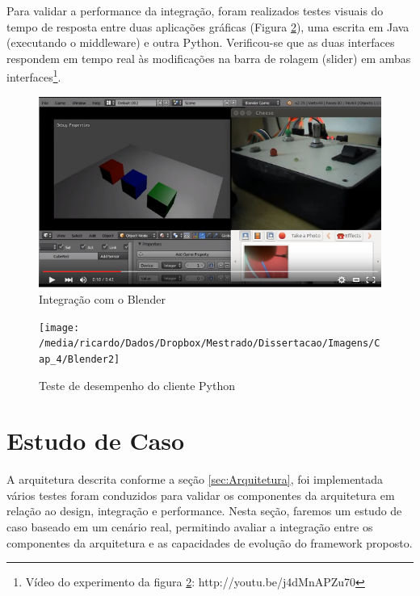 Para validar a performance da integração, foram realizados testes
visuais do tempo de resposta entre duas aplicações gráficas (Figura
\ref{fig:blender2}), uma escrita em Java (executando o middleware)
e outra Python. Verificou-se que as duas interfaces respondem em tempo
real às modificações na barra de rolagem (slider) em ambas interfaces\footnote{Vídeo do experimento da figura \ref{fig:blender2}: http://youtu.be/j4dMnAPZu70}.

\begin{figure}[h]
\begin{centering}
\includegraphics[width=1\linewidth]{Imagens/Cap_4/Blender}
\par\end{centering}
\caption{Integração com o Blender\label{fig:blender1}}
\end{figure}

\begin{figure}[h]
\begin{centering}
\texttt{[image: /media/ricardo/Dados/Dropbox/Mestrado/Dissertacao/Imagens/Cap\_4/Blender2]}
\par\end{centering}
\caption{Teste de desempenho do cliente Python\label{fig:blender2}}
\end{figure}


\section{Estudo de Caso\label{sec:Estudo-de-Caso}}

A arquitetura descrita conforme a seção \ref{sec:Arquitetura}, foi
implementada vários testes foram conduzidos para validar os componentes
da arquitetura em relação ao design, integração e performance. Nesta
seção, faremos um estudo de caso baseado em um cenário real, permitindo
avaliar a integração entre os componentes da arquitetura e as capacidades
de evolução do framework proposto.

